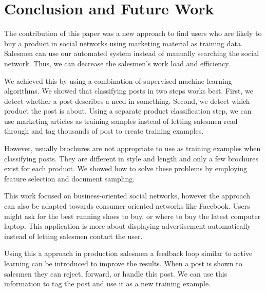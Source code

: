 \section{Conclusion and Future Work}
\label{sec:conclusion}

The contribution of this paper was a new approach to find users who are likely to buy a product in social networks using marketing material as training data.
Salesmen can use our automated system instead of manually searching the social network.
Thus, we can decrease the salesmen's work load and efficiency.

We achieved this by using a combination of supervised machine learning algorithms.
We showed that classifying posts in two steps works best. 
First, we detect whether a post describes a need in something.
Second, we detect which product the post is about.
Using a separate product classification step, we can use marketing articles as training samples instead of letting salesmen read through and tag thousands of post to create training examples.

However, usually brochures are not appropriate to use as training examples when classifying posts.
They are different in style and length and only a few brochures exist for each product.
We showed how to solve these problems by employing feature selection and document sampling.

This work focused on business-oriented social networks, however the approach can also be adapted towards consumer-oriented networks like Facebook.
Users might ask for the best running shoes to buy, or where to buy the latest computer laptop.
This application is more about displaying advertisement automatically instead of letting salesmen contact the user.

Using this a approach in production salesmen a feedback loop similar to active learning can be introduced to improve the results. When a post is shown to salesmen they can reject, forward, or handle this post. We can use this information to tag the post and use it as a new training example.

